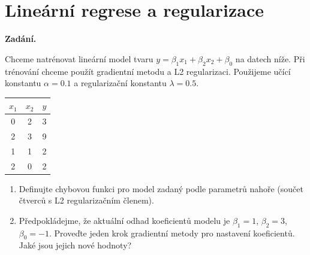 \section{Lineární regrese a regularizace}

\noindent\textbf{Zadání.}\par
Chceme natrénovat lineární model tvaru $y = \beta_1 x_1 + \beta_2 x_2 + \beta_0$ na datech níže.
Při trénování chceme použít gradientní metodu a L2 regularizaci. Použijeme učící konstantu
$\alpha = 0.1$ a regularizační konstantu $\lambda = 0.5$.

\begin{center}
\begin{tabular}{cc|c}
\toprule
$x_1$ & $x_2$ & $y$ \\
\midrule
0 & 2 & 3 \\
2 & 3 & 9 \\
1 & 1 & 2 \\
2 & 0 & 2 \\
\bottomrule
\end{tabular}
\end{center}

\begin{enumerate}
  \item Definujte chybovou funkci pro model zadaný podle parametrů nahoře (součet čtverců
    s L2 regularizačním členem).
  \item Předpokládejme, že aktuální odhad koeficientů modelu je $\beta_1 = 1$, $\beta_2 = 3$,
    $\beta_0 = -1$. Proveďte jeden krok gradientní metody pro nastavení koeficientů. Jaké jsou
    jejich nové hodnoty?
\end{enumerate}

